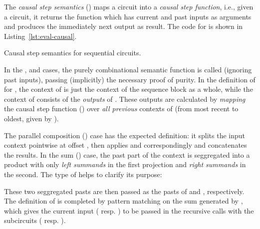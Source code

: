             The \emph{causal step semantics} () maps a circuit into a \emph{causal step function},
            i.e., given a circuit, it returns the function which has current and past inputs as arguments
            and produces the immediately next output as result.
            The code for  is shown in Listing~\ref{lst:eval-causal}.

            \begin{listing}[h]
                \caption{Causal step semantics for sequential circuits.\label{lst:eval-causal}}
            \end{listing}

            In the ,  and  cases, the purely combinational semantic function
            is called (ignoring past inputs), passing (implicitly) the necessary proof of purity.
            In the definition of  for , the context of  is just the context
            of the sequence block as a whole, while the context of  consists of the \emph{outputs}
            of .
            These outputs are calculated by \emph{mapping} the causal step function ()
            over \emph{all previous} contexts of  (from most recent to oldest, given by ).

            The parallel composition () case has the expected definition:
            it splits the input context pointwise at offset ,
            then applies    and    correspondingly and concatenates the results.
            In the sum () case, the past part of the context is seggregated into a product
            with only \emph{left summands} in the first projection and \emph{right summands} in the second.
            The type of  helps to clarify its purpose:

            \begin{center}
            \end{center}

            These two seggregated pasts are then passed as the pasts of  and , respectively.
            The definition of  is completed by pattern matching on the sum generated
            by  \AY{\{}\AY{\}} , which gives the current input
            ( resp. ) to be passed in the recursive calls with the subcircuits
            (   resp.   ).


